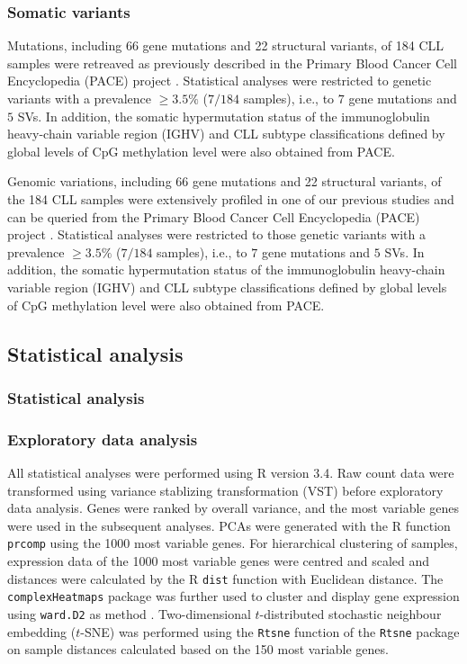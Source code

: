 \subsubsection{Somatic variants}
Mutations, including 66 gene mutations and 22 structural variants, of 184 CLL samples were retreaved as previously described in the Primary Blood Cancer Cell Encyclopedia (PACE) project \citep{Dietrich}. Statistical analyses were restricted to genetic variants with a prevalence  $\ge3.5\%$ ($7/184$ samples), i.e., to $7$ gene mutations and $5$ SVs. In addition, the somatic hypermutation status of the immunoglobulin heavy-chain variable region (IGHV) and CLL subtype classifications defined by global levels of CpG methylation \citep{Oakes2016} level  were also obtained from PACE.


Genomic variations, including 66 gene mutations and 22 structural variants, of the 184 CLL samples were extensively profiled in one of our previous studies and can be queried from the Primary Blood Cancer Cell Encyclopedia (PACE) project \citep{Dietrich}. Statistical analyses were restricted to those genetic variants with a prevalence $\ge3.5\%$ ($7/184$ samples), i.e., to $7$ gene mutations and $5$ SVs. In addition, the somatic hypermutation status of the immunoglobulin heavy-chain variable region (IGHV) and CLL subtype classifications defined by global levels of CpG methylation level \citep{Oakes2016} were also obtained from PACE.

\subsection{Statistical analysis}

\subsubsection{Statistical analysis}

\subsubsection{Exploratory data analysis}

All statistical analyses were performed using R version 3.4. Raw count data were transformed using variance stablizing transformation (VST) \citep{Love2014} before exploratory data analysis. Genes were ranked by overall variance, and the most variable genes were used in the subsequent analyses. PCAs were generated with the R function \texttt{prcomp} using the 1000 most variable genes. For hierarchical clustering of samples, expression data of the 1000 most variable genes were centred and scaled and distances were calculated by the R \texttt{dist} function with Euclidean distance. The \texttt{complexHeatmaps} package \citep{Gu2016} was further used to cluster and display gene expression using \texttt{ward.D2} as method \citep{Murtagh2014}. Two-dimensional $t$-distributed stochastic neighbour embedding ($t$-SNE) was performed using the \texttt{Rtsne} function of the \texttt{Rtsne} package \citep{R-Rtsne} on sample distances calculated based on the 150 most variable genes.


